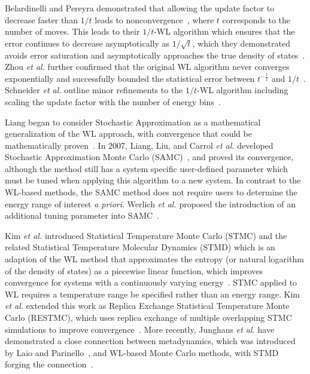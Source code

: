 \documentclass[letterpaper,twocolumn,amsmath,amssymb,pre,aps,10pt]{revtex4-1}
\begin{document}
Belardinelli and Pereyra demonstrated that allowing the update factor to
decrease faster than $1/t$ leads to nonconvergence~\cite{belardinelli2007wang},
where $t$ corresponds to the number of moves.
This leads to their $1/t$-WL algorithm which ensures that the error continues to
decrease asymptotically as $1/\sqrt{t}$, which they demonstrated avoids
error saturation and asymptotically approaches the true density of
states~\cite{belardinelli2008analysis}. Zhou \emph{et al.} further confirmed that the
original WL algorithm never converges exponentially and successfully bounded the
statistical error between $t^{-\frac12}$ and $1/t$~\cite{zhou2008optimal}.
Schneider \emph{et al.} outline minor refinements to the $1/t$-WL algorithm
including scaling the update factor with the number of energy
bins~\cite{schneider2017convergence}.


Liang began to consider Stochastic Approximation as a mathematical
generalization of the WL approach, with convergence that could be mathematically
proven~\cite{liang2006theory}. In 2007, Liang, Liu, and Carrol \emph{et al.}
developed Stochastic Approximation Monte Carlo (SAMC)~\cite{liang2007stochastic,
liang2009improving}, and proved its convergence, although the method still has a
system specific user-defined parameter which must be tuned when applying this
algorithm to a new system.  In contrast to the WL-based methods, the SAMC method
does not require users to determine the energy range of interest \emph{a
priori}. Werlich \emph{et al.} proposed the introduction of an additional tuning
parameter into SAMC~\cite{werlich2015stochastic}.

Kim \emph{et al.} introduced Statistical Temperature Monte Carlo (STMC) and the
related Statistical Temperature Molecular Dynamics (STMD) which is an
adaption of the WL method that approximates the entropy (or natural logarithm of the density of
states) as a piecewise linear function, which improves convergence for systems
with a continuously varying energy~\cite{kim2006statistical,
kim2007statistical}. STMC applied to WL requires a temperature range be
specified rather than an energy range.  Kim \emph{et al.} extended this work as
Replica Exchange Statistical Temperature Monte Carlo (RESTMC), which uses
replica exchange of multiple overlapping STMC simulations to improve
convergence~\cite{kim2009replica}. More recently, Junghans \emph{et al.} have
demonstrated a close connection between metadynamics, which was introduced by
Laio and Parinello~\cite{laio2002escaping}, and WL-based Monte Carlo methods,
with STMD forging the connection~\cite{junghans2014molecular}.
\end{document}
